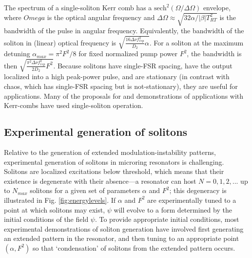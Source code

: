 {The spectrum of a single-soliton Kerr comb has a $\mathrm{sech}^2(\Omega/\Delta \Omega)$ envelope, where $Omega$ is the optical angular frequency and $\Delta\Omega\approx\sqrt{32\alpha/|\beta| T_{RT}^2 }$ is the bandwidth of the pulse in angular frequency. Equivalently, the bandwidth of the soliton in (linear) optical frequency is $\sqrt{\frac{16\Delta\nu f_{rep}^2}{D_2}\alpha}$. For a soliton at the maximum detuning $\alpha_{max}=\pi^2F^2/8$ for fixed normalized pump power $F^2$, the bandwidth is then $\sqrt{\frac{\pi^2\Delta\nu f_{rep}^2}{2 D_2}F^2}$. Because solitons have single-FSR spacing, have the output localized into a high peak-power pulse, and are stationary (in contrast with chaos, which has single-FSR spacing but is not-stationary), they are useful for applications. Many of the proposals for and demonstrations of applications with Kerr-combs have used single-soliton operation. 

\subsection{Experimental generation of solitons}


Relative to the generation of extended modulation-instability patterns, experimental generation of solitons in microring resonators is challenging. Solitons are localized excitations below threshold, which means that their existence is degenerate with their absence---a resonator can host $N=0, 1, 2,...$ up to $N_{max}$ solitons for a given set of parameters $\alpha$ and $F^2$; this degeneracy is illustrated in Fig. \ref{fig:energylevels}. If $\alpha$ and $F^2$ are experimentally tuned to a point at which solitons may exist, $\psi$ will evolve to a form determined by the initial conditions of the field $\psi$. To provide appropriate initial conditions, most experimental demonstrations of soliton generation have involved first generating an extended pattern in the resonator, and then tuning to an appropriate point $(\alpha,F^2)$ so that `condensation' of solitons from the extended pattern occurs. 

}
